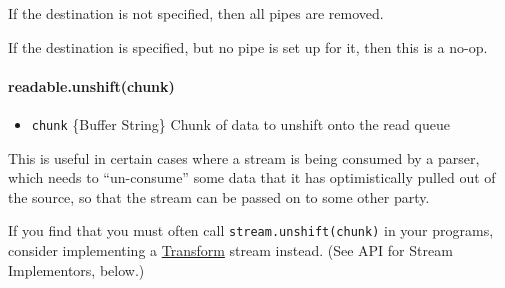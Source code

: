 If the destination is not specified, then all pipes are removed.

If the destination is specified, but no pipe is set up for it, then this
is a no-op.

\begin{Shaded}
\begin{Highlighting}[]
 \NormalTok{();}
 \NormalTok{(}\NormalTok{);}
\NormalTok{(}\NormalTok{() \{}
  \NormalTok{(}\NormalTok{);}
  \NormalTok{(}\NormalTok{);}
  \NormalTok{();}
\NormalTok{\}, }\NormalTok{);}
\end{Highlighting}
\end{Shaded}

\paragraph{readable.unshift(chunk)}\label{readable.unshiftchunk}

\begin{itemize}
\itemsep1pt\parskip0pt
\item
  \texttt{chunk} \{Buffer \textbar{} String\} Chunk of data to unshift
  onto the read queue
\end{itemize}

This is useful in certain cases where a stream is being consumed by a
parser, which needs to ``un-consume'' some data that it has
optimistically pulled out of the source, so that the stream can be
passed on to some other party.

If you find that you must often call \texttt{stream.unshift(chunk)} in
your programs, consider implementing a
\hyperref[streamux5fclassux5fstreamux5ftransform]{Transform} stream
instead. (See API for Stream Implementors, below.)

